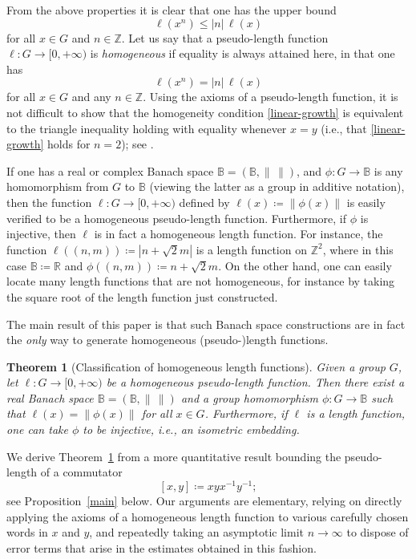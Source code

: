 \documentclass[11pt,a4paper,reqno]{amsart}
\numberwithin{equation}{section}
\theoremstyle{plain}
\newtheorem{theorem}[equation]{Theorem}
\theoremstyle{definition}
\newcommand\R{\mathbb{R}}
\newcommand\Z{\mathbb{Z}}
\newcommand\normsymb{\ell}  %
\newcommand\norm[1]{\ell({#1})}   %
\begin{document}
From the above properties it is clear that one has the upper bound
\[
\norm{x^n} \leq |n| \, \norm{x}
\]
for all $x \in G$ and $n \in \Z$.  Let us say that a pseudo-length
function $\normsymb: G\to [0,+\infty)$ is \emph{homogeneous} if equality
is always attained here, in that one has
\begin{equation}\label{linear-growth}
\norm{x^n} = |n| \, \norm{x}
\end{equation}
for all $x \in G$ and any $n \in \Z$.  Using the axioms of a
pseudo-length function, it is not difficult to show that the homogeneity
condition \eqref{linear-growth} is equivalent to the triangle inequality
holding with equality whenever $x=y$ (i.e., that \eqref{linear-growth}
holds for $n=2$); see \cite[Lemma 1]{GK}.

If one has a real or
complex Banach space $\mathbb{B} = (\mathbb{B},\| \, \|)$, and $\phi: G
\to \mathbb{B}$ is any homomorphism from $G$ to $\mathbb{B}$ (viewing the
latter as a group in additive notation), then the function $\normsymb: G
\to [0,+\infty)$ defined by $\norm{x} \coloneqq \| \phi(x) \|$ is easily
verified to be a homogeneous pseudo-length function.  Furthermore, if
$\phi$ is injective, then $\normsymb$ is in fact a
homogeneous length function.  For instance, the function
$\norm{ (n, m) } \coloneqq |n + \sqrt{2} m|$
is a length function on $\Z^2$, where in this case $\mathbb{B} \coloneqq
\R$ and $\phi((n,m)) \coloneqq n  + \sqrt{2} m$.  On the other hand, one
can easily locate many length functions that are not homogeneous, for
instance by taking the square root of the length function just
constructed.

The main result of this paper is that such Banach space constructions are
in fact the \emph{only} way to generate homogeneous (pseudo-)length
functions.

\begin{theorem}[Classification of homogeneous length functions]\label{class}
Given a group $G$, let $\normsymb: G \to [0,+\infty)$ be a homogeneous
pseudo-length function.  Then there exist a real Banach space $\mathbb{B}
= (\mathbb{B},\| \, \|)$ and a group homomorphism $\phi : G \to
\mathbb{B}$ such that $\norm{x} = \| \phi(x) \|$ for all $x \in G$.
Furthermore, if $\normsymb$ is a length function, one can take $\phi$ to
be injective, i.e., an isometric embedding.
\end{theorem}

We derive Theorem~\ref{class} from a more quantitative result
bounding the pseudo-length of a commutator
\begin{equation}\label{comdef}
[x,y] \coloneqq xyx^{-1}y^{-1};
\end{equation}
see Proposition~\ref{main} below.  Our arguments are elementary, relying
on directly applying the axioms of a homogeneous length function to
various carefully chosen words in $x$ and $y$, and repeatedly taking an
asymptotic limit $n \to \infty$ to dispose of error terms that arise in
the estimates obtained in this fashion.
\end{document}
